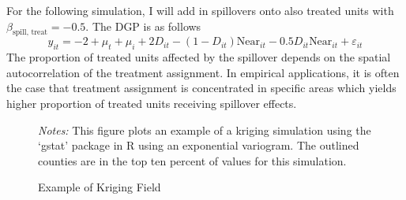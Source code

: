 \documentclass[11pt]{article}
\begin{document}
For the following simulation, I will add in spillovers onto also treated units with $\beta_{\text{spill, treat}} = -0.5$. The DGP is as follows 
\begin{equation}
    \label{dgp2} 
    y_{it} = -2 + \mu_t + \mu_i + 2 D_{it} - (1-D_{it}) \text{Near}_{it} - 0.5 D_{it} \text{Near}_{it} + \varepsilon_{it}   
\end{equation} 
The proportion of treated units affected by the spillover depends on the spatial autocorrelation of the treatment assignment. In empirical applications, it is often the case that treatment assignment is concentrated in specific areas which yields higher proportion of treated units receiving spillover effects.

\begin{figure}[htb!]
    \caption{Example of Kriging Field}
    \label{fig:kriging}
    {\centering
    }
    {\footnotesize
        \textit{Notes:} This figure plots an example of a kriging simulation using the `gstat' package in R using an exponential variogram. The outlined counties are in the top ten percent of values for this simulation. 
    }
\end{figure}
\end{document}
